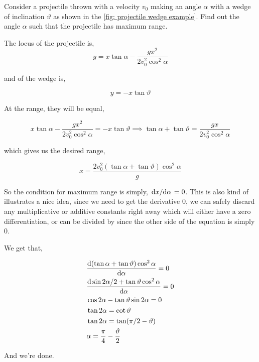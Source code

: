 \begin{example}
Consider a projectile thrown with a velocity \(v_0\) making an angle \(\alpha\) with 
a wedge of inclination \(\vartheta\) as shown in the \cref{fig: projectile wedge example}. Find out the angle \(\alpha\) 
such that the projectile has maximum range.    

\begin{soln}
    The locus of the projectile is, 
    \begin{equation*}
        y = x\tan\alpha - \frac{gx^2}{2v_0^2\cos^2\alpha}
    \end{equation*}

    and of the wedge is, 

    \begin{equation*}
        y = -x\tan\vartheta
    \end{equation*}

    At the range, they will be equal,

    \begin{equation*}
        x\tan\alpha - \frac{gx^2}{2v_0^2\cos^2\alpha} = -x\tan\vartheta \implies 
        \tan\alpha + \tan\vartheta = \frac{gx}{2v_0^2\cos^2\alpha}
    \end{equation*}

    which gives us the desired range, 

    \begin{equation*}
        x = \frac{2v_0^2(\tan\alpha + \tan\vartheta)\cos^2\alpha}{g}
    \end{equation*}

    So the condition for maximum range is simply, \(\dv*{x}{\alpha} = 0\). This is also 
    kind of illustrates a nice idea, since we need to get the derivative \(0\), we
    can safely discard any multiplicative or additive constants right away which will 
    either have a zero differentiation, or can be divided by since the other side of the 
    equation is simply \(0\). 
    
    We get that, 

    \begin{align*}
        &\dv{(\tan\alpha + \tan\vartheta)\cos^2\alpha}{\alpha} = 0 \\
        &\dv{\sin 2\alpha/2 + \tan\vartheta\cos^2\alpha}{\alpha} = 0 \\
        &\cos 2\alpha - \tan\vartheta\sin 2\alpha = 0 \\
        &\tan 2\alpha = \cot\vartheta \\
        &\tan 2\alpha = \tan (\pi/2 - \vartheta) \\
        &\alpha = \frac{\pi}{4} - \frac{\vartheta}{2}
    \end{align*}

    And we're done.
\end{soln}
\end{example}



